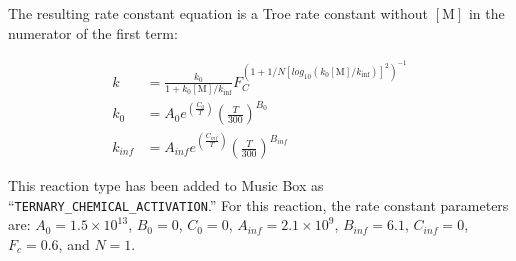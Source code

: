 \documentclass[titlepage]{article}
\begin{document}
The resulting rate constant equation is a Troe rate constant without $[\mbox{M}]$ in the numerator of the first term:

\begin{equation}
\begin{split}
k & = \frac{k_0}{1+k_0[\mbox{M}]/k_{\inf}}F_C^{(1+1/N[log_{10}(k_0[\mbox{M}]/k_{\inf})]^2)^{-1}} \\
k_0 & = A_0 e^{\left( \frac{C_0}{T} \right)} \left( \frac{T}{300} \right)^{B_0} \\
k_{inf} & = A_{inf} e^{\left( \frac{C_{inf}}{T} \right)} \left( \frac{T}{300} \right)^{B_{inf}}
\end{split}
\end{equation}

This reaction type has been added to Music Box as ``\verb>TERNARY_CHEMICAL_ACTIVATION>.'' For this reaction, the rate constant parameters are: $A_0 = 1.5 \times 10^{13}$, $B_0 = 0$, $C_0 = 0$, $A_{inf} = 2.1 \times 10^9$, $B_{inf} = 6.1$, $C_{inf} = 0$, $F_c = 0.6$, and $N = 1$.

\end{document}
